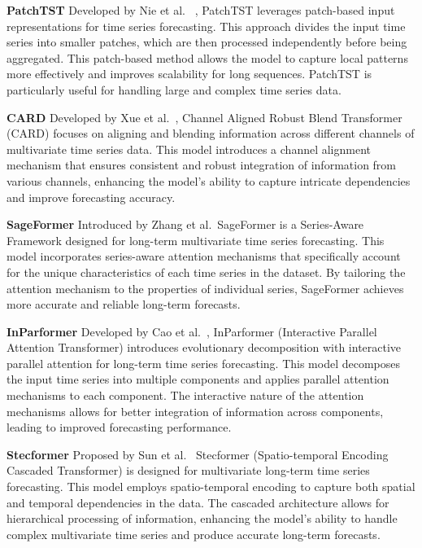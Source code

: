 \noindent\textbf
{PatchTST}
 Developed by Nie et al.~\cite{nie2023timeseriesworth64} , PatchTST leverages patch-based input representations for time series forecasting. This approach divides the input time series into smaller patches, which are then processed independently before being aggregated. This patch-based method allows the model to capture local patterns more effectively and improves scalability for long sequences. PatchTST is particularly useful for handling large and complex time series data.
\vspace{10pt}


\noindent\textbf
{CARD}
 Developed by Xue et al.~\cite{xue2024cardchannelalignedrobust}, Channel Aligned Robust Blend Transformer (CARD) focuses on aligning and blending information across different channels of multivariate time series data. This model introduces a channel alignment mechanism that ensures consistent and robust integration of information from various channels, enhancing the model’s ability to capture intricate dependencies and improve forecasting accuracy.
\vspace{10pt}


\noindent\textbf
{SageFormer}
 Introduced by Zhang et al.~\cite{zhang2023sageformerseriesawareframeworklongterm}SageFormer is a Series-Aware Framework designed for long-term multivariate time series forecasting. This model incorporates series-aware attention mechanisms that specifically account for the unique characteristics of each time series in the dataset. By tailoring the attention mechanism to the properties of individual series, SageFormer achieves more accurate and reliable long-term forecasts.
\vspace{10pt}


\noindent\textbf
{InParformer}
 Developed by Cao et al.~\cite{Cao_Huang_Yao_Wang_He_Wang_2023}, InParformer (Interactive Parallel Attention Transformer) introduces evolutionary decomposition with interactive parallel attention for long-term time series forecasting. This model decomposes the input time series into multiple components and applies parallel attention mechanisms to each component. The interactive nature of the attention mechanisms allows for better integration of information across components, leading to improved forecasting performance.
\vspace{10pt}


\noindent\textbf
{Stecformer}
 Proposed by Sun et al.~\cite{sun2023stecformerspatiotemporalencodingcascaded} Stecformer (Spatio-temporal Encoding Cascaded Transformer) is designed for multivariate long-term time series forecasting. This model employs spatio-temporal encoding to capture both spatial and temporal dependencies in the data. The cascaded architecture allows for hierarchical processing of information, enhancing the model’s ability to handle complex multivariate time series and produce accurate long-term forecasts.
\vspace{10pt}


